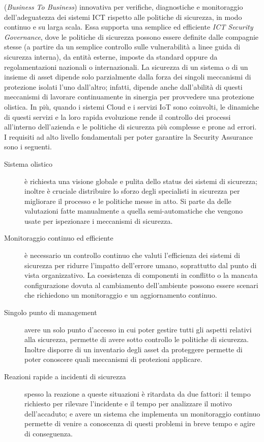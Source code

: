 (\textit{Business To Business}) innovativa per verifiche, diagnostiche e monitoraggio dell'adeguatezza dei sistemi ICT rispetto alle politiche di 
sicurezza, in modo continuo e su larga scala. Essa supporta una semplice ed efficiente \textit{ICT Security Governance}, dove le politiche 
di sicurezza possono essere definite dalle compagnie stesse (a partire da un semplice controllo sulle vulnerabilità a linee guida di
sicurezza interna), da entità esterne, imposte da standard oppure da regolamentazioni nazionali o internazionali.
La sicurezza di un sistema o di un insieme di asset dipende solo parzialmente dalla forza dei singoli meccanismi di protezione isolati
l'uno dall'altro; infatti, dipende anche dall'abilità di questi meccanismi di lavorare continuamente in sinergia per provvedere una 
protezione olistica.\hfill\break
In più, quando i sistemi Cloud e i servizi IoT sono coinvolti, le dinamiche di questi servizi e la loro rapida evoluzione rende il 
controllo dei processi all'interno dell'azienda e le politiche di sicurezza più complesse e prone ad errori. \vspace{0.5cm}\hfill\break
I requisiti ad alto livello fondamentali per poter garantire la Security Assurance sono i seguenti.
\begin{description}
    \item[Sistema olistico] è richiesta una visione globale e pulita dello status dei sistemi di sicurezza; inoltre è cruciale 
    distribuire lo sforzo degli specialisti in sicurezza per migliorare il processo e le politiche messe in atto. Si parte da 
    delle valutazioni fatte manualmente a quella semi-automatiche che vengono usate per ispezionare i meccanismi di sicurezza. 
    \item[Monitoraggio continuo ed efficiente] è necessario un controllo continuo che valuti l'efficienza dei sistemi di sicurezza 
    per ridurre l'impatto dell'errore umano, soprattutto dal punto di vista organizzativo. La coesistenza di componenti in conflitto o
    la mancata configurazione dovuta al cambiamento dell'ambiente possono essere scenari che richiedono un monitoraggio e un 
    aggiornamento continuo.
    \item[Singolo punto di management] avere un solo punto d'accesso in cui poter gestire tutti gli aspetti relativi alla sicurezza, 
    permette di avere sotto controllo le politiche di sicurezza. Inoltre disporre di un inventario degli asset da proteggere permette di
    poter conoscere quali meccanismi di protezioni applicare.
    \item[Reazioni rapide a incidenti di sicurezza] spesso la reazione a queste situazioni è ritardata da due fattori: il tempo 
    richiesto per rilevare l'incidente e il tempo per analizzare il motivo dell'accaduto; e avere un sistema che implementa un monitoraggio
    continuo permette di venire a conoscenza di questi problemi in breve tempo e agire di conseguenza.
    \label{list:security-assurance-fondamentals}
\end{description}
